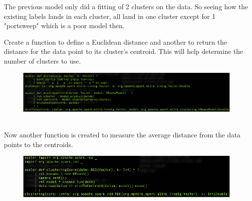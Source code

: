 \documentclass[10pt]{article}
\begin{document}
\indent The previous model only did a fitting of 2 clusters on the data. So seeing how the existing labels lands in each cluster, all land in one cluster except for 1 "portsweep" which is a poor model then.
\par
{}%
\hfill
{}%
\par
Create a function to define a Euclidean distance and another to return the distance for the data point to its cluster's centroid. This will help determine the number of clusters to use.
\begin{figure}[!h]
\includegraphics[scale=0.37]{2functions.png}
\centering
\end{figure}\\
\indent Now another function is created to measure the average distance from the data points to the centroids.
\begin{figure}[!h]
\includegraphics[scale=0.37]{avgDist.png}
\centering
\end{figure}\\
\end{document}
